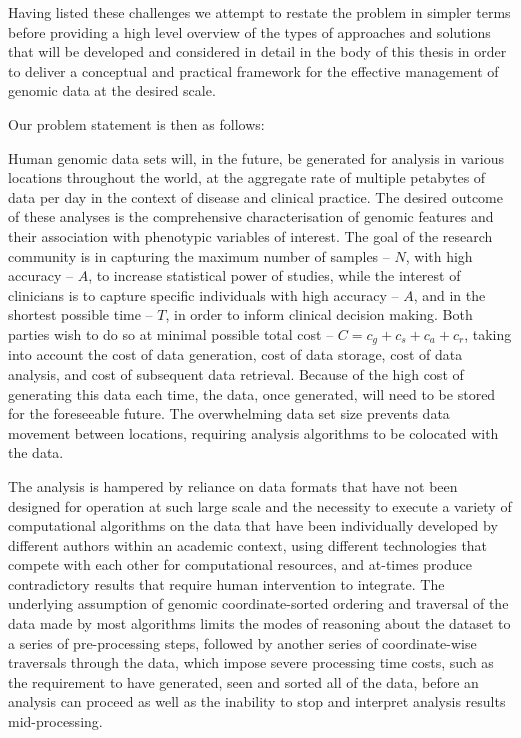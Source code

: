 Having listed these challenges we attempt to restate the problem in simpler terms before providing a high level overview of the types of approaches and solutions that will be developed and considered in detail in the body of this thesis in order to deliver a conceptual and practical framework for the effective management of genomic data at the desired scale.

Our problem statement is then as follows:

Human genomic data sets will, in the future, be generated for analysis in various locations throughout the world, at the aggregate rate of multiple petabytes of data per day in the context of disease and clinical practice. The desired outcome of these analyses is the comprehensive characterisation of genomic features and their association with phenotypic variables of interest\autocite{welter2013nhgri}. The goal of the research community is in capturing the maximum number of samples -- $N$, with high accuracy -- $A$, to increase statistical power of studies\autocite{hong2012sample}, while the interest of clinicians is to capture specific individuals with high accuracy -- $A$, and in the shortest possible time -- $T$, in order to inform clinical decision making\autocite{voelkerding2009next}. Both parties wish to do so at minimal possible total cost -- $C = c_{g} + c_{s} + c_{a} + c_{r}$, taking into account the cost of data generation, cost of data storage, cost of data analysis, and cost of subsequent data retrieval. Because of the high cost of generating this data each time, the data, once generated, will need to be stored for the foreseeable future. The overwhelming data set size prevents data movement between locations, requiring analysis algorithms to be colocated with the data. 

The analysis is hampered by reliance on data formats that have not been designed for operation at such large scale and the necessity to execute a variety of computational algorithms\autocite{li2009fast,zhao2013computational,alkan2011genome,mclaren2016ensembl}  on the data that have been individually developed by different authors within an academic context, using different technologies that compete with each other for computational resources, and at-times produce contradictory results that require human intervention to integrate. The underlying assumption of genomic coordinate-sorted ordering and traversal of the data made by most algorithms limits the modes of reasoning about the dataset to a series of pre-processing steps, followed by another series of coordinate-wise traversals through the data, which impose severe processing time costs, such as the requirement to have generated, seen and sorted all of the data, before an analysis can proceed as well as the inability to stop and interpret analysis results mid-processing. 


